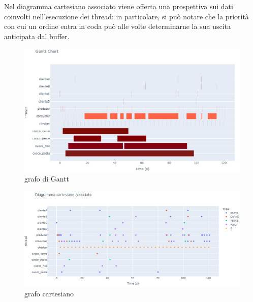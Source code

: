 Nel diagramma cartesiano associato viene offerta una prospettiva sui dati coinvolti nell'esecuzione dei thread: in particolare, si può notare che la priorità con cui un ordine entra in coda può alle volte determinarne la sua uscita anticipata dal buffer.

\begin{figure}[htbp]
	\centering
	\includegraphics[scale=0.7]{iterazione3/images/gantt_example.jpg}
	\caption{grafo di Gantt\label{fig:Gantt_example}}
\end{figure}

\begin{figure}[htbp]
	\centering
	\includegraphics[scale=0.7]{iterazione3/images/cartesiano_example.jpg}
	\caption{grafo cartesiano\label{fig:cartesiano-example}}
\end{figure}

\clearpage